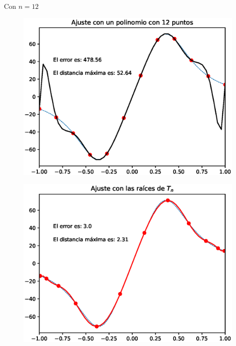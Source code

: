 Con $n = 12$
\\
\begin{minipage}{0.45\linewidth}
    \begin{figure}[H]
    \centering
    \includegraphics[scale=0.44]{Imagenes/Interpolacion_Chebychev_12_Polinomio.eps}
    \end{figure}       
\end{minipage}
\hspace{0.1cm}
\begin{minipage}{0.45\linewidth}
\begin{figure}[H]
    \centering
    \includegraphics[scale=0.44]{Imagenes/Interpolacion_Chebychev_12_Raices.eps}
\end{figure}
\end{minipage}

